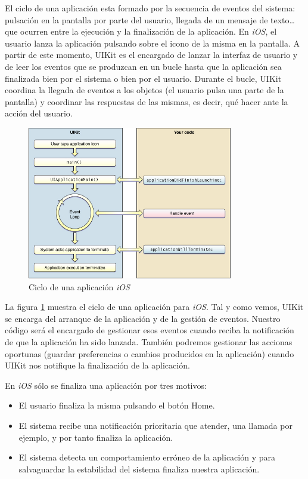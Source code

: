 	El ciclo de una aplicación esta formado por la secuencia de eventos del sistema:  pulsación en la pantalla por parte del usuario, llegada de un mensaje de texto\ldots que ocurren entre la ejecución y la finalización de la aplicación. En \emph{iOS}, el usuario lanza la aplicación pulsando sobre el icono de la misma en la pantalla.  A partir de este momento, UIKit es el encargado de lanzar la interfaz de usuario y de leer los eventos que se produzcan en un bucle hasta que la aplicación sea finalizada bien por el sistema o bien por el usuario. Durante el bucle, UIKit coordina la llegada de eventos a los objetos (el usuario pulsa una parte de la pantalla) y coordinar las respuestas de las mismas, es decir, qué hacer ante la acción del usuario. 
	     
 \begin{figure} [h]
  \centering
    \includegraphics[width=0.8\textwidth]{./images/app_life_cycle.jpg}
  \caption{Ciclo de una aplicación \emph{iOS} }
  \label{fig:iOS-layers}
\end{figure}
     
   La figura \ref{fig:iOS-layers} muestra el ciclo de una aplicación para \emph{iOS}. Tal y como vemos, UIKit se encarga del arranque de la aplicación y de la gestión de eventos. Nuestro código será el encargado de gestionar esos eventos cuando reciba la notificación de que la aplicación ha sido lanzada. También podremos gestionar las accionas oportunas (guardar preferencias o cambios producidos en la aplicación) cuando UIKit nos notifique la finalización de la aplicación.
   
    En \emph{iOS} sólo se finaliza una aplicación por tres motivos:
    \begin{itemize}
	\item El usuario finaliza la misma pulsando el botón \textsf{Home}. 
	\item El sistema recibe una notificación prioritaria que atender, una llamada por ejemplo, y por tanto finaliza la aplicación.
	\item El sistema detecta un comportamiento erróneo de la aplicación y para salvaguardar la estabilidad del sistema finaliza nuestra aplicación.
     \end{itemize}

